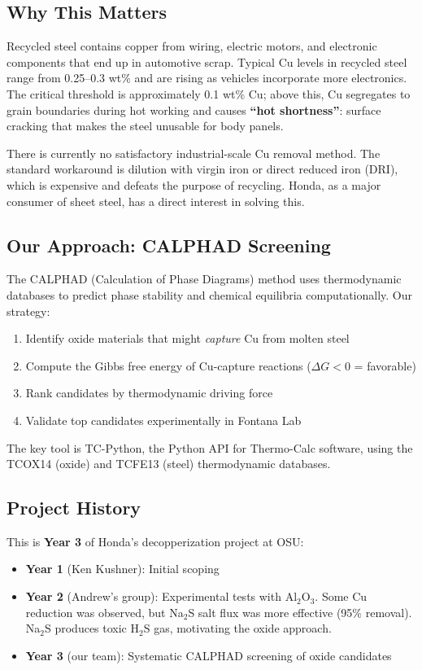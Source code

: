 \documentclass[11pt]{article}
\begin{document}
\subsection{Why This Matters}

Recycled steel contains copper from wiring, electric motors, and electronic components that end up in automotive scrap. Typical Cu levels in recycled steel range from 0.25--0.3 wt\% and are rising as vehicles incorporate more electronics. The critical threshold is approximately 0.1 wt\% Cu; above this, Cu segregates to grain boundaries during hot working and causes \textbf{``hot shortness''}: surface cracking that makes the steel unusable for body panels.

There is currently no satisfactory industrial-scale Cu removal method. The standard workaround is dilution with virgin iron or direct reduced iron (DRI), which is expensive and defeats the purpose of recycling. Honda, as a major consumer of sheet steel, has a direct interest in solving this.

\subsection{Our Approach: CALPHAD Screening}

The CALPHAD (Calculation of Phase Diagrams) method uses thermodynamic databases to predict phase stability and chemical equilibria computationally. Our strategy:

\begin{enumerate}[leftmargin=*]
    \item Identify oxide materials that might \textit{capture} Cu from molten steel
    \item Compute the Gibbs free energy of Cu-capture reactions ($\Delta G < 0$ = favorable)
    \item Rank candidates by thermodynamic driving force
    \item Validate top candidates experimentally in Fontana Lab
\end{enumerate}

The key tool is TC-Python, the Python API for Thermo-Calc software, using the TCOX14 (oxide) and TCFE13 (steel) thermodynamic databases.

\subsection{Project History}

This is \textbf{Year 3} of Honda's decopperization project at OSU:
\begin{itemize}[leftmargin=*]
    \item \textbf{Year 1} (Ken Kushner): Initial scoping
    \item \textbf{Year 2} (Andrew's group): Experimental tests with Al$_2$O$_3$. Some Cu reduction was observed, but Na$_2$S salt flux was more effective (95\% removal). Na$_2$S produces toxic H$_2$S gas, motivating the oxide approach.
    \item \textbf{Year 3} (our team): Systematic CALPHAD screening of oxide candidates
\end{itemize}
\end{document}
